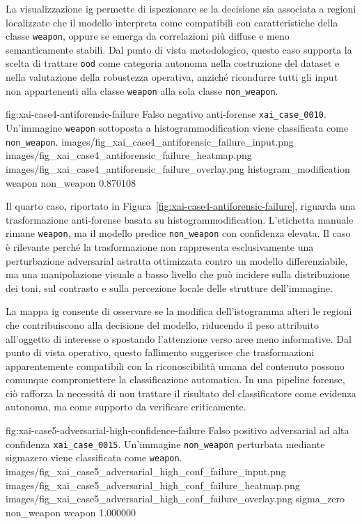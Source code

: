 La visualizzazione \gls{ig} permette di ispezionare se la decisione sia associata
a regioni localizzate che il modello interpreta come compatibili con
caratteristiche della classe \texttt{weapon}, oppure se emerga da correlazioni
più diffuse e meno semanticamente stabili. Dal punto di vista metodologico,
questo caso supporta la scelta di trattare \texttt{ood} come categoria autonoma
nella costruzione del dataset e nella valutazione della robustezza operativa,
anziché ricondurre tutti gli input non appartenenti alla classe \texttt{weapon}
alla sola classe \texttt{non\_weapon}.

\XAIcaseFigure
{fig:xai-case4-antiforensic-failure}
{Falso negativo anti-forense \texttt{xai\_case\_0010}. Un'immagine \texttt{weapon} sottoposta a \gls{histogrammodification} viene classificata come \texttt{non\_weapon}.}
{images/fig_xai_case4_antiforensic_failure_input.png}
{images/fig_xai_case4_antiforensic_failure_heatmap.png}
{images/fig_xai_case4_antiforensic_failure_overlay.png}
{histogram\_modification}
{weapon}
{non\_weapon}
{0.870108}

Il quarto caso, riportato in Figura~\ref{fig:xai-case4-antiforensic-failure},
riguarda una trasformazione anti-forense basata su
\gls{histogrammodification}. L'etichetta manuale rimane \texttt{weapon}, ma
il modello predice \texttt{non\_weapon} con confidenza elevata. Il caso è
rilevante perché la trasformazione non rappresenta esclusivamente una
perturbazione adversarial astratta ottimizzata contro un modello differenziabile,
ma una manipolazione visuale a basso livello che può incidere sulla distribuzione
dei toni, sul contrasto e sulla percezione locale delle strutture dell'immagine.

La mappa \gls{ig} consente di osservare se la modifica dell'istogramma alteri le
regioni che contribuiscono alla decisione del modello, riducendo il peso
attribuito all'oggetto di interesse o spostando l'attenzione verso aree meno
informative. Dal punto di vista operativo, questo fallimento suggerisce che
trasformazioni apparentemente compatibili con la riconoscibilità umana del
contenuto possono comunque compromettere la classificazione automatica. In una
pipeline forense, ciò rafforza la necessità di non trattare il risultato del
classificatore come evidenza autonoma, ma come supporto da verificare
criticamente.

\XAIcaseFigure
{fig:xai-case5-adversarial-high-confidence-failure}
{Falso positivo adversarial ad alta confidenza \texttt{xai\_case\_0015}. Un'immagine \texttt{non\_weapon} perturbata mediante \gls{sigmazero} viene classificata come \texttt{weapon}.}
{images/fig_xai_case5_adversarial_high_conf_failure_input.png}
{images/fig_xai_case5_adversarial_high_conf_failure_heatmap.png}
{images/fig_xai_case5_adversarial_high_conf_failure_overlay.png}
{sigma\_zero}
{non\_weapon}
{weapon}
{1.000000}

